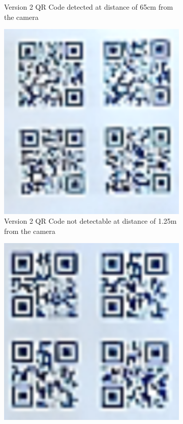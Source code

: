 \documentclass[12pt]{article}
\begin{document}
\begin{figure}[H]
\begin{subfigure}{0.4\textwidth}
        \caption{Version 2 QR Code detected at distance of 65cm from the camera}
        \label{fig:qrcodeb}
    \end{subfigure}
    \begin{subfigure}{0.4\textwidth}
        \includegraphics[width=1\textwidth]{images/figures/fig7c}
        \caption{Version 2 QR Code not detectable at distance of 1.25m from the camera}
        \label{fig:qrcodec}
    \end{subfigure}
    \begin{subfigure}{0.4\textwidth}
        \includegraphics[width=1\textwidth]{images/figures/fig7d}

\end{subfigure}
\end{figure}
\end{document}
